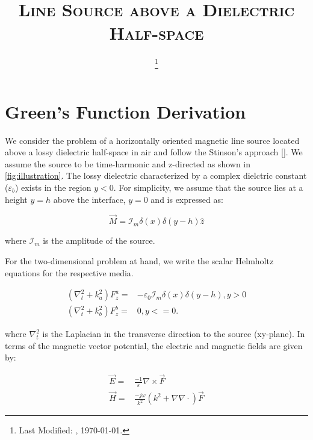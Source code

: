 \documentclass{article}
\begin{document}
  \title{\textsc{Line Source above a Dielectric Half-space}\\}
  \date{\footnote{Last Modified: \currenttime, \today.}}
  \maketitle
\section{Green's Function Derivation}
  We consider the problem of a horizontally oriented magnetic line source located above a lossy dielectric half-space in air and follow the Stinson's approach [\cite{stinson1976intermediate, nevels2014behavior}]. We assume the source to be time-harmonic and z-directed as shown in \ref{fig:illustration}. The lossy dielectric characterized by a complex dielctric constant ($\varepsilon_b$) exists in the region $y < 0$. For simplicity, we assume that the source lies at a height $y = h$ above the interface, $y = 0$ and is expressed as:

  \begin{equation}
    \overrightarrow{M} = \mathcal{I}_m \delta(x) \delta(y -h) \widehat{z}
    \label{eq:Current}
  \end{equation}

  where $\mathcal{I}_m$ is the amplitude of the source.

  For the two-dimensional problem at hand, we write the scalar Helmholtz equations for the respective media.

  \begin{subequations}
    \begin{align}
      \left( \nabla_t^2 + k_a^2 \right) F_z^a ={}& -\varepsilon_0 \mathcal{I}_m  \delta(x) \delta(y - h), y > 0
      \label{eq:Hemup} \\
      \left( \nabla_t^2 + k_b^2 \right) F_z^b ={}& 0,     y <= 0
      \label{eq:Hemdn}.
    \end{align}
    \label{Hem}
  \end{subequations}

  where $\nabla_t^2$ is the Laplacian in the transverse direction to the source (xy-plane). In terms of the magnetic vector potential, the electric and magnetic fields are given by:

  \begin{subequations}
    \begin{align}
      \overrightarrow{E}  ={}& \frac{-1}{\varepsilon} \nabla \times \overrightarrow{F}
      \label{eq:E} \\
      \overrightarrow{H}  ={}& \frac{-j\omega}{k^2} \left( k^2 + \nabla \nabla \cdot \right) \overrightarrow{F}
      \label{eq:H}
    \end{align}
  \end{subequations}
\end{document}
